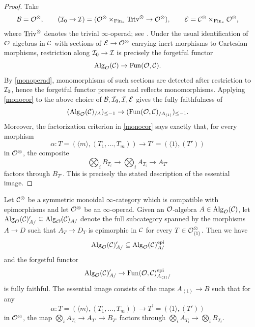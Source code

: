 \documentclass[10pt,a4paper,oneside]{article}
\begin{document}
\begin{proof}
Take
\[
\mathcal{B}=\mathcal{O}^\otimes,\qquad 
(\mathcal{I}_0\to\mathcal{I})=
(\mathcal{O}^\otimes\times_{\operatorname{Fin}_*}\operatorname{Triv}^\otimes\to \mathcal{O}^\otimes),
\qquad
\mathcal{E}=\mathcal{C}^\otimes\times_{\operatorname{Fin}_*}\mathcal{O}^\otimes,
\]
where $\operatorname{Triv}^\otimes$ denotes the trivial $\infty$-operad; see \cite[Example 2.1.1.20]{ha}. Under the usual identification of $\mathcal{O}$-algebras in $\mathcal{C}$ with sections of $\mathcal{E}\to\mathcal{O}^\otimes$ carrying inert morphisms to Cartesian morphisms, restriction along $\mathcal{I}_0\to\mathcal{I}$ is precisely the forgetful functor
\[
\operatorname{Alg}_{\mathcal{O}}(\mathcal{C})\to \operatorname{Fun}(\mathcal{O},\mathcal{C}).
\]
By \cref{monoperad}, monomorphisms of such sections are detected after
restriction to $\mathcal{I}_0$, hence the forgetful functor preserves and reflects monomorphisms. Applying \cref{monocor} to the above choice of $\mathcal{B},\mathcal{I}_0,\mathcal{I},\mathcal{E}$ gives the fully faithfulness of
\[
(\operatorname{Alg}_{\mathcal{O}}(\mathcal{C})_{/A})_{\leq-1}\to
(\operatorname{Fun}(\mathcal{O},\mathcal{C})_{/A_{\left<1\right>}})_{\leq-1}.
\]
Moreover, the factorization criterion in \cref{monocor} says exactly that, for every morphism
\[
\alpha:T=\left(\langle m\rangle,\left(T_1,\ldots,T_m\right)\right)
\to
T'=\left(\langle 1\rangle,(T')\right)
\]
in $\mathcal{O}^\otimes$, the composite
\[
\bigotimes_i B_{T_i}\to \bigotimes_i A_{T_i}\to A_{T'}
\]
factors through $B_{T'}$. This is precisely the stated description of the essential image.
\end{proof}

\begin{prop}
Let $\mathcal{C}^\otimes$ be a symmetric monoidal $\infty$-category which is compatible with epimorphisms and let $\mathcal{O}^\otimes$ be an $\infty$-operad. Given an $\mathcal{O}$-algebra $A\in\operatorname{Alg}_{\mathcal{O}}(\mathcal{C})$, let $\operatorname{Alg}_{\mathcal{O}}(\mathcal{C})_{A/}^{\prime}\subseteq \operatorname{Alg}_{\mathcal{O}}(\mathcal{C})_{A/}$ denote the full subcategory spanned by the morphisms $A\to D$ such that $A_T\to D_T$ is epimorphic in $\mathcal{C}$ for every $T\in \mathcal{O}^\otimes_{\left<1\right>}$.
Then we have $$\operatorname{Alg}_{\mathcal{O}}(\mathcal{C})_{A/}^{\prime}\subseteq \operatorname{Alg}_{\mathcal{O}}(\mathcal{C})_{A/}^{\operatorname{epi}}$$ and the forgetful functor $$\operatorname{Alg}_{\mathcal{O}}(\mathcal{C})_{A/}^{\prime}\to \operatorname{Fun}(\mathcal{O},\mathcal{C})_{A_{\left<1\right>}/}^{\operatorname{epi}}$$ is fully faithful. The essential image consists of the maps $ A_{\left<1\right>}\to B$ such that for any
\[
\alpha: T=\left(\langle m\rangle,\left(T_1, \ldots, T_m\right)\right)\to T^{\prime}=\left(\langle 1\rangle,(T')\right)
\]
in $\mathcal{O}^\otimes$, the map $\bigotimes_{i}A_{T_i}\to  A_{T'} \to B_{T'}$ factors through $\bigotimes_{i}A_{T_i}\to\bigotimes_{i}B_{T_i}$.
\end{prop}
\end{document}
